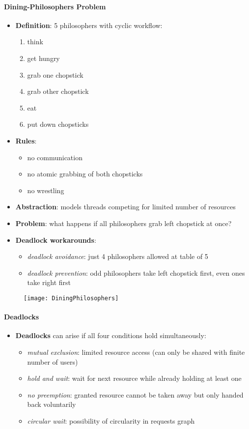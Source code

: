 \paragraph{Dining-Philosophers Problem}
\begin{itemize}
  \item \textbf{Definition}: 5 philosophers with cyclic workflow:
  \begin{enumerate}
    \item think
    \item get hungry
    \item grab one chopstick
    \item grab other chopstick
    \item eat
    \item put down chopsticks
  \end{enumerate}
  \item \textbf{Rules}:
  \begin{itemize}
    \item no communication
    \item no atomic grabbing of both chopsticks
    \item no wrestling
  \end{itemize}
  \item \textbf{Abstraction}: models threads competing for limited number of resources
  \item \textbf{Problem}: what happens if all philosophers grab left chopstick at once?
  \item \textbf{Deadlock workarounds}:
  \begin{itemize}
    \item \emph{deadlock avoidance}: just 4 philosophers allowed at table of 5
    \item \emph{deadlock prevention}: odd philosophers take left chopstick first, even ones take right first
  \end{itemize}
\end{itemize}
\begin{figure}[h]\centering\label{DiningPhilosophers}\texttt{[image: DiningPhilosophers]}\end{figure}

\paragraph{Deadlocks}
\begin{itemize}
  \item \textbf{Deadlocks} can arise if all four conditions hold simultaneously:
  \begin{itemize}
    \item \emph{mutual exclusion}: limited resource access (can only be shared with finite number of users)
    \item \emph{hold and wait}: wait for next resource while already holding at least one
    \item \emph{no preemption}: granted resource cannot be taken away but only handed back voluntarily
    \item \emph{circular wait}: possibility of circularity in requests graph
  \end{itemize}
\end{itemize}

